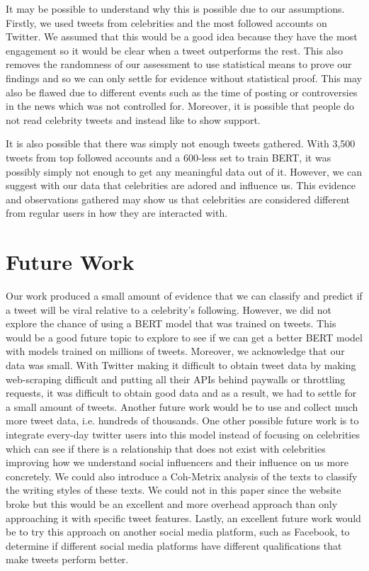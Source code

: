 \documentclass{article}
\begin{document}
It may be possible to understand why this is possible due to our assumptions. 
Firstly, we used tweets from celebrities and the most followed accounts on Twitter. 
We assumed that this would be a good idea because they have the most engagement so it would be clear when a tweet outperforms the rest.
This also removes the randomness of our assessment to use statistical means to prove our findings and so we can only settle for evidence without statistical proof.
This may also be flawed due to different events such as the time of posting or controversies in the news which was not controlled for.
Moreover, it is possible that people do not read celebrity tweets and instead like to show support.

It is also possible that there was simply not enough tweets gathered. 
With 3,500 tweets from top followed accounts and a 600-less set to train BERT, it was possibly simply not enough to get any meaningful data out of it. However, we can suggest with our data that celebrities are adored and influence us. 
This evidence and observations gathered may show us that celebrities are considered different from regular users in how they are interacted with.

\section{Future Work}
\label{sec:future}

Our work produced a small amount of evidence that we can classify and predict if a tweet will be viral relative to a celebrity's following. 
However, we did not explore the chance of using a BERT model that was trained on tweets.
This would be a good future topic to explore to see if we can get a better BERT model with models trained on millions of tweets. 
Moreover, we acknowledge that our data was small. 
With Twitter making it difficult to obtain tweet data by making web-scraping difficult and putting all their APIs behind paywalls or throttling requests, it was difficult to obtain good data and as a result, we had to settle for a small amount of tweets. 
Another future work would be to use and collect much more tweet data, i.e. hundreds of thousands.
One other possible future work is to integrate every-day twitter users into this model instead of focusing on celebrities which can see if there is a relationship that does not exist with celebrities improving how we understand social influencers and their influence on us more concretely. 
We could also introduce a Coh-Metrix analysis of the texts to classify the writing styles of these texts. 
We could not in this paper since the website broke but this would be an excellent and more overhead approach than only approaching it with specific tweet features.
Lastly, an excellent future work would be to try this approach on another social media platform, such as Facebook, to determine if different social media platforms have different qualifications that make tweets perform better.
\end{document}
